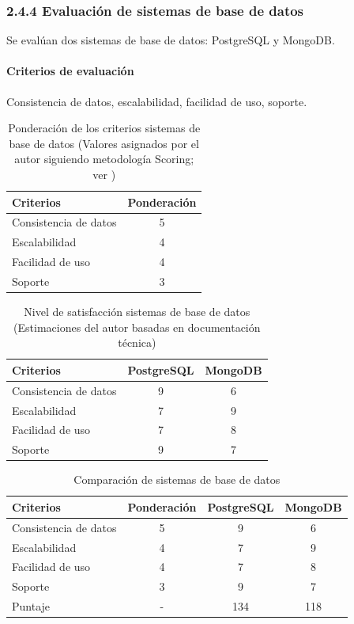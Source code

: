 \subsubsection{2.4.4 Evaluación de sistemas de base de datos}
Se evalúan dos sistemas de base de datos: PostgreSQL y MongoDB.

\paragraph{Criterios de evaluación}
Consistencia de datos, escalabilidad, facilidad de uso, soporte.
\begin{table}[ht]
\centering
\caption{Ponderación de los criterios sistemas de base de datos (Valores asignados por el autor siguiendo metodología Scoring; ver \cite{belton2002})}
\begin{tabular}{l c}
\hline
Criterios & Ponderación \\
\hline
Consistencia de datos & 5 \\
Escalabilidad & 4 \\
Facilidad de uso & 4 \\
Soporte & 3 \\
\hline
\end{tabular}
\end{table}

\begin{table}[ht]
\centering
\caption{Nivel de satisfacción sistemas de base de datos (Estimaciones del autor basadas en documentación técnica)}
\begin{tabular}{l c c}
\hline
Criterios & PostgreSQL & MongoDB \\
\hline
Consistencia de datos & 9 & 6 \\
Escalabilidad & 7 & 9 \\
Facilidad de uso & 7 & 8 \\
Soporte & 9 & 7 \\
\hline
\end{tabular}
\end{table}

\begin{table}[ht]
\centering
\caption{Comparación de sistemas de base de datos}
\begin{tabular}{l c c c}
\hline
Criterios & Ponderación & PostgreSQL & MongoDB \\
\hline
Consistencia de datos & 5 & 9 & 6 \\
Escalabilidad & 4 & 7 & 9 \\
Facilidad de uso & 4 & 7 & 8 \\
Soporte & 3 & 9 & 7 \\
\hline
Puntaje & - & 134 & 118 \\
\hline
\end{tabular}
\end{table}

